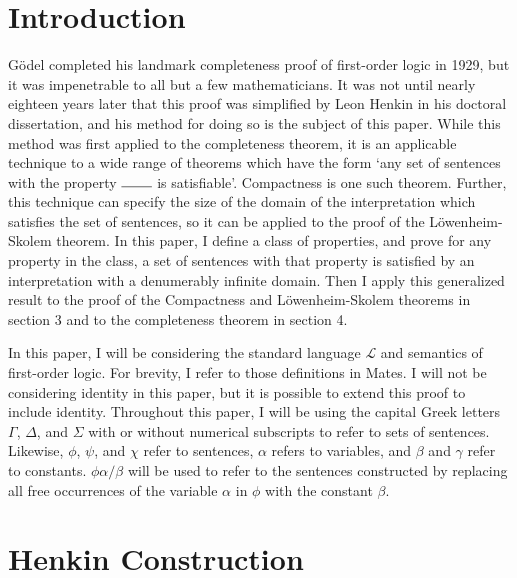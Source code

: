 \documentclass[12pt]{article}
\theoremstyle{definition}
\theoremstyle{remark}
\begin{document}
\maketitle

\section{Introduction}

G{\"o}del completed his landmark completeness proof of first-order logic in 1929, but it was impenetrable to all but a few mathematicians\cite{bezhanishvili}. It was not until nearly eighteen years later that this proof was simplified by Leon Henkin in his doctoral dissertation, and his method for doing so is the subject of this paper. While this method was first applied to the completeness theorem, it is an applicable technique to a wide range of theorems which have the form `any set of sentences with the property $\rule{.75cm}{0.15mm}$ is satisfiable'. Compactness is one such theorem. Further, this technique can specify the size of the domain of the interpretation which satisfies the set of sentences, so it can be applied to the proof of the L{\"o}wenheim-Skolem theorem. In this paper, I define a class of properties, and prove for any property in the class, a set of sentences with that property is satisfied by an interpretation with a denumerably infinite domain. Then I apply this generalized result to the proof of the Compactness and L{\"o}wenheim-Skolem theorems in section 3 and to the completeness theorem in section 4.

In this paper, I will be considering the standard language $\mathscr{L}$ and semantics of first-order logic. For brevity, I refer to those definitions in Mates\cite{mates}. I will not be considering identity in this paper, but it is possible to extend this proof to include identity. Throughout this paper, I will be using the capital Greek letters $\Gamma$, $\Delta$, and $\Sigma$ with or without numerical subscripts to refer to sets of sentences. Likewise, $\phi$, $\psi$, and $\chi$ refer to sentences, $\alpha$ refers to variables, and $\beta$ and $\gamma$ refer to constants. $\phi\alpha/\beta$ will be used to refer to the sentences constructed by replacing all free occurrences of the variable $\alpha$ in $\phi$ with the constant $\beta$.

\section{Henkin Construction}
\end{document}
